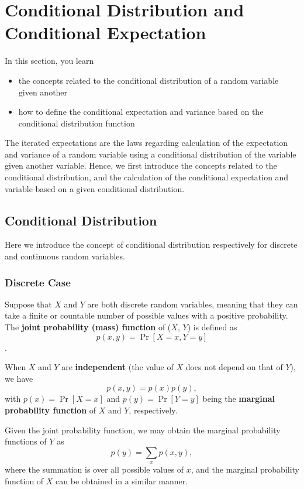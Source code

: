 \documentclass[]{book}
\providecommand{\tightlist}{%
  \setlength{\itemsep}{0pt}\setlength{\parskip}{0pt}}
\theoremstyle{definition}
\theoremstyle{definition}
\theoremstyle{definition}
\theoremstyle{remark}
\begin{document}
\section{Conditional Distribution and Conditional
Expectation}\label{S:AppB:CD}

In this section, you learn

\begin{itemize}
\tightlist
\item
  the concepts related to the conditional distribution of a random
  variable given another
\item
  how to define the conditional expectation and variance based on the
  conditional distribution function
\end{itemize}

The iterated expectations are the laws regarding calculation of the
expectation and variance of a random variable using a conditional
distribution of the variable given another variable. Hence, we first
introduce the concepts related to the conditional distribution, and the
calculation of the conditional expectation and variable based on a given
conditional distribution.

\subsection{Conditional Distribution}\label{conditional-distribution}

Here we introduce the concept of conditional distribution respectively
for discrete and continuous random variables.

\subsubsection{Discrete Case}\label{discrete-case}

Suppose that \(X\) and \(Y\) are both discrete random variables, meaning
that they can take a finite or countable number of possible values with
a positive probability. The \textbf{joint probability (mass) function}
of (\(X\), \(Y\)) is defined as \[p(x,y) = \Pr[X=x, Y=y]\].

When \(X\) and \(Y\) are \textbf{independent} (the value of \(X\) does
not depend on that of \(Y\)), we have \[p(x,y)=p(x)p(y),\] with
\(p(x)=\Pr[X=x]\) and \(p(y)=\Pr[Y=y]\) being the \textbf{marginal
probability function} of \(X\) and \(Y\), respectively.

Given the joint probability function, we may obtain the marginal
probability functions of \(Y\) as \[p(y)=\sum_x p(x,y),\] where the
summation is over all possible values of \(x\), and the marginal
probability function of \(X\) can be obtained in a similar manner.
\end{document}
